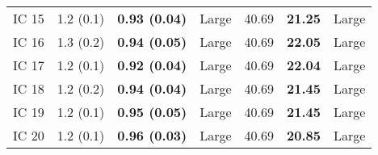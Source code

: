\begin{tabular}{lllllll}
 IC 15 &         1.2 (0.1) &  \textbf{0.93 (0.04)} &       Large &                   40.69 &           \textbf{21.25} &       Large \\
 IC 16 &         1.3 (0.2) &  \textbf{0.94 (0.05)} &       Large &                   40.69 &           \textbf{22.05} &       Large \\
 IC 17 &         1.2 (0.1) &  \textbf{0.92 (0.04)} &       Large &                   40.69 &           \textbf{22.04} &       Large \\
 IC 18 &         1.2 (0.2) &  \textbf{0.94 (0.04)} &       Large &                   40.69 &           \textbf{21.45} &       Large \\
 IC 19 &         1.2 (0.1) &  \textbf{0.95 (0.05)} &       Large &                   40.69 &           \textbf{21.45} &       Large \\
 IC 20 &         1.2 (0.1) &  \textbf{0.96 (0.03)} &       Large &                   40.69 &           \textbf{20.85} &       Large \\
\bottomrule
\end{tabular}
